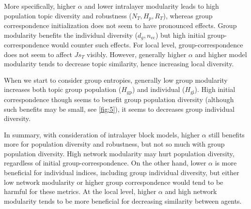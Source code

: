 More specifically, higher $\alpha$ and lower intralayer modularity leads to high population topic diversity and robustness ($N_T, H_p, R_T$), whereas group correspondence initialization does not seem to have pronounced effects. Group modularity benefits the individual diversity ($d_g, n_{\mathrm{cc}}$) but high initial group-correspondence would counter such effects. For local level, group-correspondence does not seem to affect $Js_T$ visibly. However, generally higher $\alpha$ and higher model modularity tends to decrease topic similarity, hence increasing local diversity.

When we start to consider group entropies, generally low group modularity increases both topic group population ($H_{\mathrm{gp}}$) and individual ($H_{\mathrm{gi}}$). High initial correspondence though seems to benefit group population diversity (although such benefits may be small, see \ref{fig:5}), it seems to decreases  group individual diversity.

In summary, with consideration of intralayer block models, higher $\alpha$ still benefits more for population diversity and robustness, but not so much with group population diversity. High network modularity may hurt population diversity, regardless of initial group-correspondence. On the other hand, lower $\alpha$ is more beneficial for individual indices, including group individual diversity, but either low network modularity or higher group correspondence would tend to be harmful for these metrics. At the local level, higher $\alpha$ and high network modularity tends to be more beneficial for decreasing similarity between agents.

